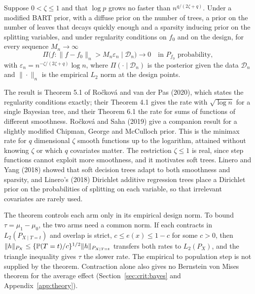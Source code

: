 \begin{theorem}\label{thm:bart}
Suppose $0 < \zeta \leq 1$ and that $\log p$ grows no faster than $n^{q/(2\zeta + q)}$. Under a modified BART prior, with a diffuse prior on the number of trees, a prior on the number of leaves that decays quickly enough and a sparsity inducing prior on the splitting variables, and under regularity conditions on $f_0$ and on the design, for every sequence $M_n \to \infty$
\[
\Pi\bigl(f : \|f - f_0\|_n > M_n\varepsilon_n \mid \mathcal{D}_n\bigr) \to 0 \quad \text{in } P_{f_0} \text{ probability},
\]
with $\varepsilon_n = n^{-\zeta/(2\zeta + q)}\log n$,
where $\Pi(\cdot \mid \mathcal{D}_n)$ is the posterior given the data $\mathcal{D}_n$ and $\|\cdot\|_n$ is the empirical $L_2$ norm at the design points.
\end{theorem}

The result is Theorem 5.1 of Ro\v{c}kov\'a and van der Pas (2020), which states the regularity conditions exactly; their Theorem 4.1 gives the rate with $\sqrt{\log n}$ for a single Bayesian tree, and their Theorem 6.1 the rate for sums of functions of different smoothness. Ro\v{c}kov\'a and Saha (2019) give a companion result for a slightly modified Chipman, George and McCulloch prior. This is the minimax rate for $q$ dimensional $\zeta$ smooth functions up to the logarithm, attained without knowing $\zeta$ or which $q$ covariates matter. The restriction $\zeta \leq 1$ is real, since step functions cannot exploit more smoothness, and it motivates soft trees. Linero and Yang (2018) showed that soft decision trees adapt to both smoothness and sparsity, and Linero's (2018) Dirichlet additive regression trees place a Dirichlet prior on the probabilities of splitting on each variable, so that irrelevant covariates are rarely used.

The theorem controls each arm only in its empirical design norm. To bound $\tau = \mu_1 - \mu_0$, the two arms need a common norm. If each contracts in $L_2(P_{X \mid T = t})$ and overlap is strict, $c \leq e(x) \leq 1 - c$ for some $c > 0$, then $\|h\|_{P_X} \leq \{\mathbb{P}(T = t)/c\}^{1/2}\|h\|_{P_{X \mid T = t}}$ transfers both rates to $L_2(P_X)$, and the triangle inequality gives $\tau$ the slower rate. The empirical to population step is not supplied by the theorem. Contraction alone also gives no Bernstein von Mises theorem for the average effect (Section~\ref{sec:crit:bayes} and Appendix~\ref{app:theory}).

